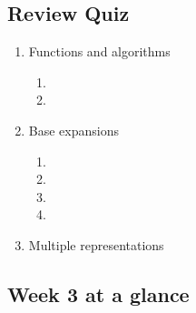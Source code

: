 \subsection*{Review Quiz}
\begin{enumerate}
\item Functions and algorithms
\begin{enumerate}
    \item {}
    \item {}
\end{enumerate}
\item Base expansions
\begin{enumerate}
    \item {}
    \item {}
    \item {}
    \item {}
\end{enumerate}
\item Multiple representations
{}
\end{enumerate}


\newpage

\subsection*{Week 3 at a glance}

